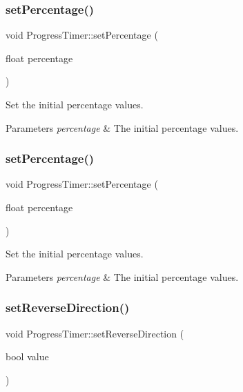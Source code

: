 \subsubsection{\texorpdfstring{set\+Percentage()}{setPercentage()}\hspace{0.1cm}{\footnotesize\ttfamily [1/2]}}
{\footnotesize\ttfamily void Progress\+Timer\+::set\+Percentage (\begin{DoxyParamCaption}\item[{float}]{percentage }\end{DoxyParamCaption})}

Set the initial percentage values.


\begin{DoxyParams}{Parameters}
{\em percentage} & The initial percentage values. \\
\hline
\end{DoxyParams}
\mbox{\label{classProgressTimer_a13901defa20b543b0d92bbf043215945}} 
\subsubsection{\texorpdfstring{set\+Percentage()}{setPercentage()}\hspace{0.1cm}{\footnotesize\ttfamily [2/2]}}
{\footnotesize\ttfamily void Progress\+Timer\+::set\+Percentage (\begin{DoxyParamCaption}\item[{float}]{percentage }\end{DoxyParamCaption})}

Set the initial percentage values.


\begin{DoxyParams}{Parameters}
{\em percentage} & The initial percentage values. \\
\hline
\end{DoxyParams}
\mbox{\label{classProgressTimer_a1bfa9056523c014a8453caf962a1e69c}} 
\subsubsection{\texorpdfstring{set\+Reverse\+Direction()}{setReverseDirection()}\hspace{0.1cm}{\footnotesize\ttfamily [1/2]}}
{\footnotesize\ttfamily void Progress\+Timer\+::set\+Reverse\+Direction (\begin{DoxyParamCaption}\item[{bool}]{value }\end{DoxyParamCaption})}

